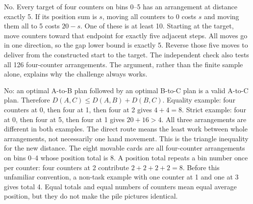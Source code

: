 No. Every target of four counters on bins 0--5 has an arrangement at distance exactly 5. If its position sum is $s$, moving all counters to 0 costs $s$ and moving them all to 5 costs $20-s$. One of these is at least 10. Starting at the target, move counters toward that endpoint for exactly five adjacent steps. All moves go in one direction, so the gap lower bound is exactly 5. Reverse those five moves to deliver from the constructed start to the target. The independent check also tests all 126 four-counter arrangements. The argument, rather than the finite sample alone, explains why the challenge always works.

No: an optimal A-to-B plan followed by an optimal B-to-C plan is a valid A-to-C plan. Therefore $D(A,C)\le D(A,B)+D(B,C)$. Equality example: four counters at 0, then four at 1, then four at 2 gives $4+4=8$. Strict example: four at 0, then four at 5, then four at 1 gives $20+16>4$. All three arrangements are different in both examples. The direct route means the least work between whole arrangements, not necessarily one hand movement. This is the triangle inequality for the new distance.
\newpage
{}
The eight movable cards are all four-counter arrangements on bins 0--4 whose position total is 8. A position total repeats a bin number once per counter: four counters at 2 contribute $2+2+2+2=8$. Before this unfamiliar convention, a non-task example with one counter at 1 and one at 3 gives total 4. Equal totals and equal numbers of counters mean equal average position, but they do not make the pile pictures identical.

